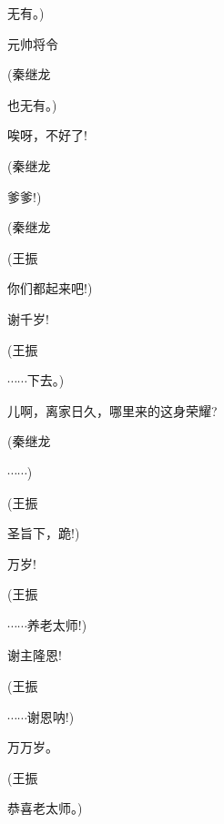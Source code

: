 {{无有。)}

{元帅将令}\hspace{30pt}~

{(秦继龙\hspace{40pt}~

也无有。)}

{唉呀，不好了!}\hspace{20pt}~


{(秦继龙\hspace{40pt}~

爹爹!)}

{(秦继龙\hspace{40pt}~

 }

{(王振\hspace{40pt}~

你们都起来吧!)}

{谢千岁!}\hspace{30pt}~

{(王振\hspace{40pt}~

$\cdots{}\cdots{}$下去。)}

{儿啊，离家日久，哪里来的这身荣耀?}

{(秦继龙\hspace{40pt}~

$\cdots{}\cdots{}$)}

{(王振\hspace{40pt}~

圣旨下，跪!)}

{万岁!}\hspace{40pt}~

{(王振\hspace{40pt}~

$\cdots{}\cdots{}$养老太师!)}

{谢主隆恩!}\hspace{30pt}~

{(王振\hspace{40pt}~

$\cdots{}\cdots{}$谢恩呐!)}

{万万岁。}\hspace{30pt}~

{(王振\hspace{40pt}~

恭喜老太师。)}

}
